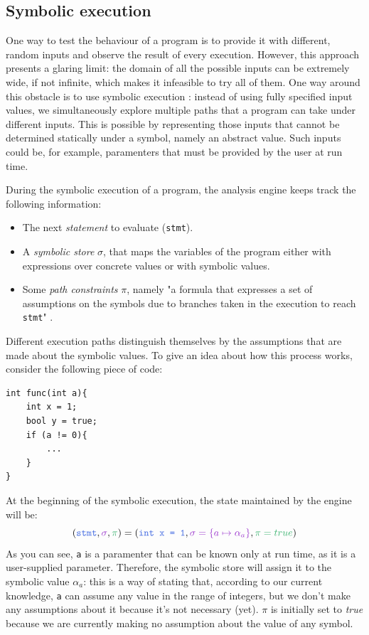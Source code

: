 \documentclass[12pt,a4paper]{book}
\theoremstyle{definition}
\begin{document}
	\subsection{Symbolic execution}\label{sec:symbolic-exec}
	One way to test the behaviour of a program is to provide it with different, random inputs and observe the result of every execution. However, this approach presents a glaring limit: the domain of all the possible inputs can be extremely wide, if not infinite, which makes it infeasible to try all of them. One way around this obstacle is to use symbolic execution \cite{Baldoni2018} \cite{King76}: instead of using fully specified input values, we simultaneously explore multiple paths that a program can take under different inputs. This is possible by representing those inputs that cannot be determined statically under a symbol, namely an abstract value. Such inputs could be, for example, paramenters that must be provided by the user at run time.
	
	During the symbolic execution of a program, the analysis engine keeps track the following information:
	\begin{itemize}
		\item The next \textit{statement} to evaluate (\texttt{stmt}).
		\item A \textit{symbolic store} $\sigma$, that maps the variables of the program either with expressions over concrete values or with symbolic values.
		\item Some \textit{path constraints} $\pi$, namely "a formula that expresses a set of assumptions on the symbols due to branches taken in the execution to reach \texttt{stmt}" \cite{Baldoni2018}.
	\end{itemize}
	Different execution paths distinguish themselves by the assumptions that are made about the symbolic values. To give an idea about how this process works, consider the following piece of code:
	
	\vspace{3mm}
	\begin{minipage}{.4\textwidth}
	\begin{lstlisting}
int func(int a){
	int x = 1;
	bool y = true;
	if (a != 0){
		...
	}
}
	\end{lstlisting} 
	\end{minipage}

	At the beginning of the symbolic execution, the state maintained by the engine will be:
	\[
	(\textcolor{blue}{\texttt{stmt}}, \textcolor{violet}{\sigma}, \textcolor{green}{\pi}) = (\textcolor{blue}{\texttt{int x = 1}}, \textcolor{violet}{\sigma = \{a \mapsto \alpha_a\}}, \textcolor{green}{\pi = true})
	\]
	As you can see, \texttt{a} is a paramenter that can be known only at run time, as it is a user-supplied parameter. Therefore, the symbolic store will assign it to the symbolic value $\alpha_a$: this is a way of stating that, according to our current knowledge, \texttt{a} can assume any value in the range of integers, but we don't make any assumptions about it because it's not necessary (yet). $\pi$ is initially set to \textit{true} because we are currently making no assumption about the value of any symbol.
	
\end{document}
